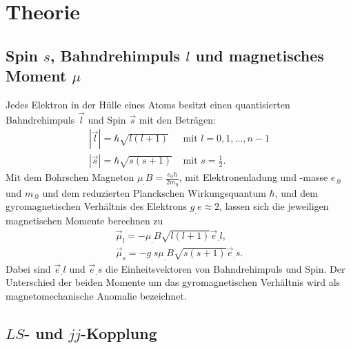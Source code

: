 
\section{Theorie}
\label{sec:Theorie}

\subsection{Spin $s$, Bahndrehimpuls $l$ und magnetisches Moment $\mu$}

Jedes Elektron in der Hülle eines Atoms besitzt einen quantisierten Bahndrehimpuls $\vec{l}$ und Spin $\vec{s}$ mit den Beträgen:
\begin{align*}
	|\vec{l}|= \hbar \sqrt{l(l+1)}&\text{ mit } l=0,1,\hdots,n-1\\
	|\vec{s}|= \hbar \sqrt{s(s+1)}&\text{ mit } s=\frac{1}{2}\text{.}
\end{align*}
\noindent Mit dem Bohrschen Magneton $\mu_.B=\frac{e_0 \hbar}{2 m_0}$, mit Elektronenladung und -masse $e_.0$ und $m_.0$ und dem reduzierten Planckschen Wirkungsquantum $\hbar$, und dem gyromagnetischen Verhältnis des Elektrons $g_.e\approx 2$, lassen sich die jeweiligen magnetischen Momente berechnen zu
\begin{gather*}
	\vec{\mu}_l=-\mu_.{B} \sqrt{l(l+1)} \vec{e}_.l, \\
	\vec{\mu}_s=- g_.{s} \mu_.{B} \sqrt{s(s+1)} \vec{e}_.s\text{.}
\end{gather*}
Dabei sind $\vec{e}_.l$ und $\vec{e}_.s$ die Einheitsvektoren von Bahndrehimpuls und Spin. Der Unterschied der beiden Momente um das gyromagnetischen Verhältnis wird als magnetomechanische Anomalie bezeichnet.


\subsection{$LS$- und $jj$-Kopplung}

